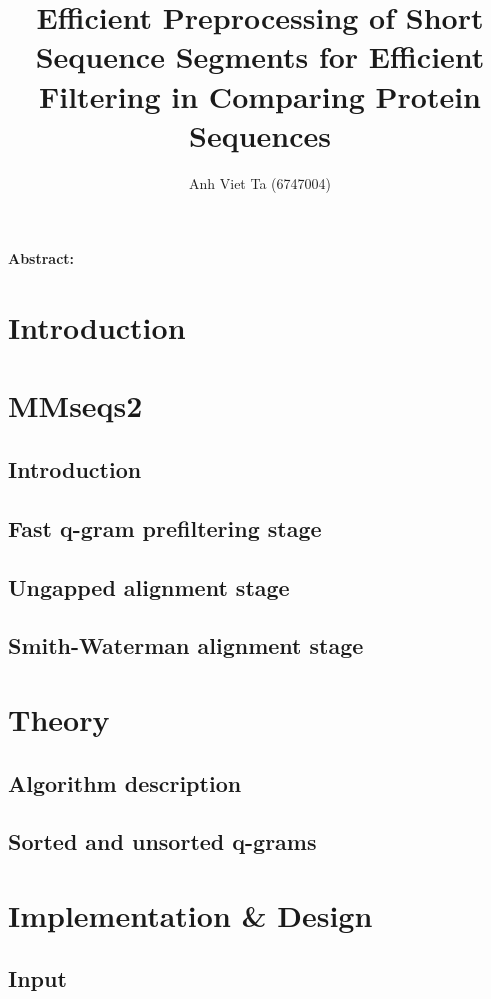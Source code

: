 \documentclass[11pt,a4paper]{scrartcl}
\title{Efficient Preprocessing of Short Sequence Segments for Efficient Filtering in Comparing Protein Sequences}
\author{Anh Viet Ta (6747004)}
\begin{document}
\begin{titlepage}
\maketitle
{}%
\thispagestyle{empty}

\textbf{Abstract:} 
\end{titlepage}
\setcounter{page}{1}

\section{Introduction}
\section{MMseqs2}
\subsection{Introduction}
\subsection{Fast q-gram prefiltering stage}
\subsection{Ungapped alignment stage}
\subsection{Smith-Waterman alignment stage}
\section{Theory}
\subsection{Algorithm description}

\subsection{Sorted and unsorted q-grams}
\section{Implementation \& Design}
\subsection{Input}

\end{document}
